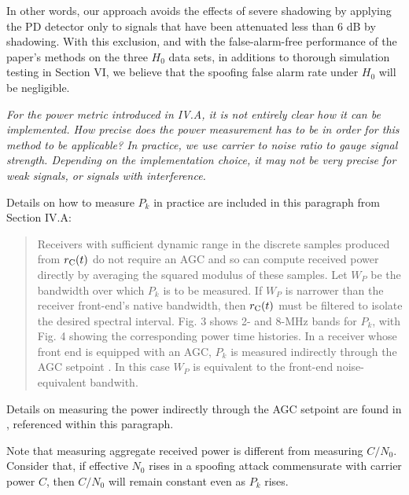 \documentclass[12pt]{report}
\begin{document}
{{        In other words, our approach avoids the effects of severe shadowing by
        applying the PD detector only to signals that have been attenuated
        less than 6 dB by shadowing.  With this exclusion, and with the
        false-alarm-free performance of the paper's methods on the three $H_0$
        data sets, in additions to thorough simulation testing in Section VI,
        we believe that the spoofing false alarm rate under $H_0$ will be
        negligible.}}
  


{\textit{For the power metric introduced in IV.A, it is not
      entirely clear how it can be implemented. How precise does
      the power measurement has to be in order for this method
      to be applicable? In practice, we use carrier to noise
      ratio to gauge signal strength. Depending on the
      implementation choice, it may not be very precise for weak
      signals, or signals with interference. }}

  
   Details on how to measure $P_k$ in practice are included in this
    paragraph from Section IV.A:

    \begin{quotation}
      Receivers with sufficient dynamic range in the discrete samples produced
      from $r_{\rm C}(t)$ do not require an AGC and so can compute received
      power directly by averaging the squared modulus of these samples.  Let
      $W_{P}$ be the bandwidth over which $P_k$ is to be measured.  If $W_P$
      is narrower than the receiver front-end's native bandwidth, then
      $r_{\rm C}(t)$ must be filtered to isolate the desired spectral
      interval.  Fig. 3 shows 2- and 8-MHz bands for $P_k$,
      with Fig. 4 showing the corresponding power time
      histories.  In a receiver whose front end is equipped with an AGC, $P_k$
      is measured indirectly through the AGC setpoint \cite{akos2012s}.  In
      this case $W_{P}$ is equivalent to the front-end noise-equivalent
      bandwith.
    \end{quotation}

    Details on measuring the power indirectly through the AGC setpoint are
    found in \cite{akos2012s}, referenced within this paragraph.

      Note that measuring aggregate received power is different from measuring
      $C/N_0$.  Consider that, if effective $N_0$ rises in a spoofing attack
      commensurate with carrier power $C$, then $C/N_0$ will remain constant
      even as $P_k$ rises.
\end{document}
